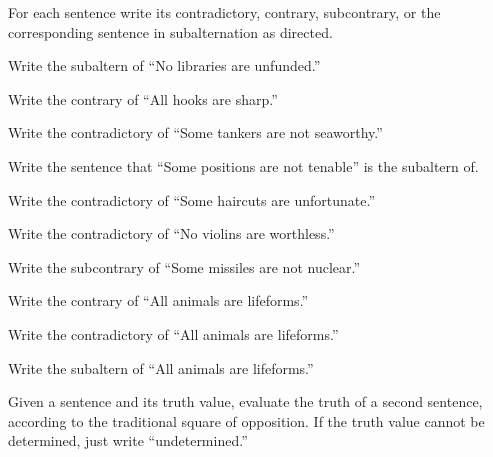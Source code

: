 \noindent \problempart For each sentence write its contradictory, contrary, subcontrary, or the corresponding sentence in subalternation as directed.

\begin{exercises}
\item Write the subaltern of ``No libraries are unfunded.''
\item Write the contrary of ``All hooks are sharp.''
\item Write the contradictory of ``Some tankers are not seaworthy.''
\item Write the sentence that ``Some positions are not tenable'' is the subaltern of.
\item Write the contradictory of ``Some haircuts are unfortunate.''
\item Write the contradictory of ``No violins are worthless.''
\item Write the subcontrary of ``Some missiles are not nuclear.''
\item Write the contrary of ``All animals are lifeforms.''
\item Write the contradictory of ``All animals are lifeforms.''
\item Write the subaltern of ``All animals are lifeforms.''
\end{exercises}

\noindent \problempart Given a sentence and its truth value, evaluate the truth of a second sentence, according to the traditional square of opposition. If the truth value cannot be determined, just write ``undetermined.''

